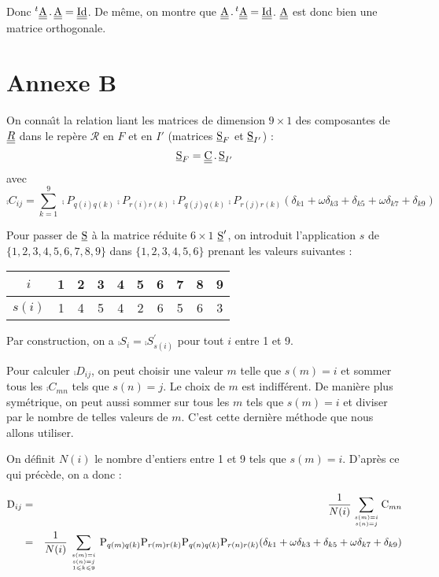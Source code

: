Donc $^t\underline{\underline{\textrm{A}}}\,.\,\underline{\underline{\textrm{A}}}=\underline{\underline{\textrm{Id}}}$. De m\^eme, on montre que
$\underline{\underline{\textrm{A}}}\,.\,^t\underline{\underline{\textrm{A}}}=\underline{\underline{\textrm{Id}}}$. $\underline{\underline{\textrm{A}}}$ est donc bien une matrice
orthogonale.


\section{Annexe B}

On conna\^\i t la relation liant les matrices de dimension $9\times1$
des composantes de $\underline{\underline{R}}$ dans le rep\`ere $\mathcal{R}$ en $F$ et en $I'$
(matrices $\underline{\textrm{S}}_F$ et $\underline{\textrm{S}}_{I'}$) :
\begin{equation}
\underline{\textrm{S}}_F=\underline{\underline{\textrm{C}}}\,.\,\underline{\textrm{S}}_{I'}
\end{equation}
avec
\begin{equation}
\comp{C}_{ij}=\sum_{k=1}^9
\comp{P}_{q(i)q(k)}\comp{P}_{r(i)r(k)}\comp{P}_{q(j)q(k)}\comp{P}_{r(j)r(k)}
(\delta_{k1}+\omega\delta_{k3}+\delta_{k5}+\omega\delta_{k7}+\delta_{k9})
\end{equation}

Pour passer de $\underline{\textrm{S}}$ \`a la matrice r\'eduite $6\times 1$ $\underline{\textrm{S}}^\prime$,
on introduit l'application $s$ de $\{1,2,3,4,5,6,7,8,9\}$ dans
$\{1,2,3,4,5,6\}$ prenant les valeurs suivantes :
\begin{center}
\begin{tabular}{|c|c|c|c|c|c|c|c|c|c|}
\hline
$i$&1&2&3&4&5&6&7&8&9\\
\hline
$s(i)$&1&4&5&4&2&6&5&6&3\\
\hline
\end{tabular}
\end{center}
Par construction, on a $\comp{S}_i=\comp{S}^\prime_{s(i)}$ pour tout $i$ entre 1
et 9.

Pour calculer $\comp{D}_{ij}$, on peut choisir une valeur $m$ telle que
$s(m)=i$ et sommer tous les $\comp{C}_{mn}$ tels que $s(n)=j$. Le choix de $m$
est indiff\'erent. De mani\`ere plus sym\'etrique, on peut aussi sommer sur tous
les $m$ tels que $s(m)=i$ et diviser par le nombre de telles valeurs de $m$. C'est
cette derni\`ere m\'ethode que nous allons utiliser.

On d\'efinit $N(i)$ le nombre d'entiers entre 1 et 9 tels que
$s(m)=i$. D'apr\`es ce qui pr\'ec\`ede, on a donc :

\begin{eqnarray}
\textrm{D}_{ij}&=&\frac{1}{N(i)}\sum_{s(m)=i \atop s(n)=j}\textrm{C}_{mn}\nonumber\\
&=&\frac{1}{N(i)}\sum_{{s(m)=i \atop s(n)=j}\atop 1\leqslant k\leqslant 9}
\textrm{P}_{q(m)q(k)}\textrm{P}_{r(m)r(k)}\textrm{P}_{q(n)q(k)}\textrm{P}_{r(n)r(k)}
(\delta_{k1}+\omega\delta_{k3}+\delta_{k5}+\omega\delta_{k7}+\delta_{k9})
\end{eqnarray}


